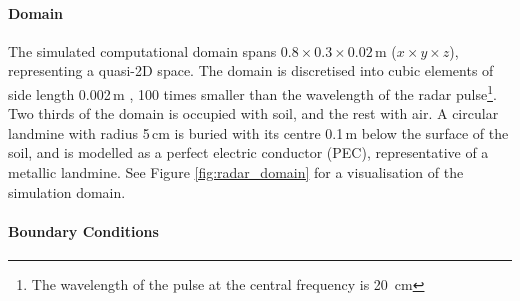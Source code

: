         \paragraph{Domain}

            \noindent The simulated computational domain spans $0.8\times 0.3\times0.02$\,m ($x\times y\times z$), representing a quasi-2D space. The domain is discretised into cubic elements of side length 0.002\,m , 100 times smaller than the wavelength of the radar pulse\footnote{The wavelength of the pulse at the central frequency is 20~cm}. Two thirds of the domain is occupied with soil, and the rest with air. A circular landmine with radius 5\,cm is buried with its centre 0.1\,m below the surface of the soil, and is modelled as a perfect electric conductor (PEC), representative of a metallic landmine. See Figure \ref{fig:radar_domain} for a visualisation of the simulation domain.


        \paragraph{Boundary Conditions}
        
